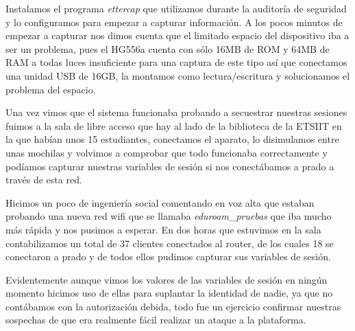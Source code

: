 \bigskip
Instalamos el programa \textit{ettercap} que utilizamos durante la auditoría de seguridad y lo configuramos para empezar a capturar información. A los pocos minutos de empezar a capturar nos dimos cuenta que el limitado espacio del dispositivo iba a ser un problema, pues el HG556a cuenta con sólo 16MB de ROM y 64MB de RAM a todas luces insuficiente para una captura de este tipo así que conectamos una unidad USB de 16GB, la montamos como lectura/escritura y solucionamos el problema del espacio.

\bigskip
Una vez vimos que el sistema funcionaba probando a secuestrar nuestras sesiones fuimos a la sala de libre acceso que hay al lado de la biblioteca de la ETSIIT en la que habían unos 15 estudiantes, conectamos el aparato, lo disimulamos entre unas mochilas y volvimos a comprobar que todo funcionaba correctamente y podíamos capturar nuestras variables de sesión si nos conectábamos a prado a través de esta red.

\bigskip
Hicimos un poco de ingeniería social comentando en voz alta que estaban probando una nueva red wifi que se llamaba \textit{eduroam\_pruebas} que iba mucho más rápida y nos pusimos a esperar. En dos horas que estuvimos en la sala contabilizamos un total de 37 clientes conectados al router, de los cuales 18 se conectaron a prado y de todos ellos pudimos capturar sus variables de sesión.

\bigskip
Evidentemente aunque vimos los valores de las variables de sesión en ningún momento hicimos uso de ellas para suplantar la identidad de nadie, ya que no contábamos con la autorización debida, todo fue un ejercicio confirmar nuestras sospechas de que era realmente fácil realizar un ataque a la plataforma.




